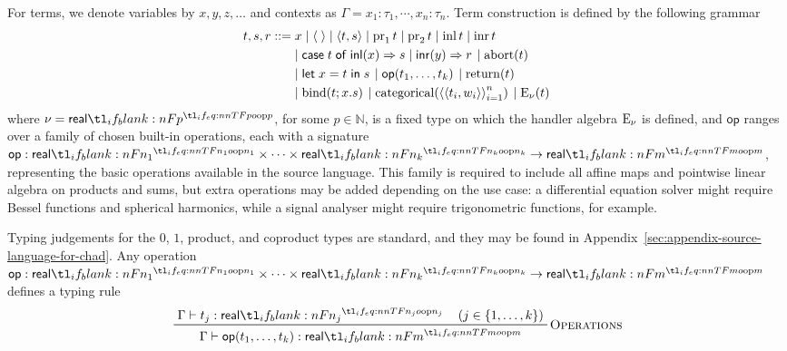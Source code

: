 \documentclass[11pt,a4paper]{article}
\theoremstyle{definition}
\theoremstyle{remark}
\providecommand{\N}{\mathbb{N}}
\providecommand{\srcop}{\mathsf{op}}
\providecommand{\casest}[5]{\mathsf{case}\;#1\;\mathsf{of}\;\mathsf{inl}(#2)\Rightarrow #3\;|\;\mathsf{inr}(#4)\Rightarrow #5}
\providecommand{\letst}[3]{\mathsf{let}\;#1=#2\;\mathsf{in}\;#3}
\begin{document}
For terms, we denote variables by \( x, y, z, \dots \) and contexts as \( \Gamma = x_{1} : \tau_{1}, \cdots, x_{n} : \tau_{n} \). Term construction is defined by the following grammar
\begin{equation}
  \label{eq:source-language-term-construction-grammar}
  \begin{aligned}
    t, s, r ::=
    &
      \left.
      x
      \mid
      \tuple{\;}
      \mid
      \tuple{t, s}
      \mid
      \opn[b]{pr}_{1} t
      \mid
      \opn[b]{pr}_{2} t
      \mid
      \opn[b]{inl} t
      \mid
      \opn[b]{inr} t
      \right.
    \\
    &
      \left.
      \mid
      \casest{t}{x}{s}{y}{r}
      \right.
    \left.
    \mid
    \fn[n]{ \opn[b]{abort} }{ t }
    \right.
    \\
    &
      \left.
      \mid
      \letst{x}{t}{s}
      \right.
    \left.
    \mid
    \fn[n]{ \srcop }{ t_{1}, \dots, t_{k} }
    \right.
      \left.
      \mid
      \fn[n]{ \opn[b]{return} }{ t }
      \right.
    \\
    &
      \left.
      \mid
      \fn[n]{ \opn[b]{bind} }{ t; x . s }
      \right.
      \left.
      \mid
      \fn[n]{ \opn[b]{categorical} }{
      \tuple{
      \tuple{
      t_{i}, w_{i}
      }
      }_{i = 1}^{n}
      }
      \right.
    \left.
    \mid
    \fn[n]{ \opn[b]{E}_{\nu} }{ t }
    \right.
  \end{aligned}
\end{equation}
where \( \nu = \srcreal[p] \), for some \( p \in \N \), is a fixed type on which the handler algebra \( \opn[b]{E}_{\nu} \) is defined, and \( \srcop \) ranges over a family of chosen built-in operations, each with a signature \( \srcop: \srcreal[n_{1}] \times \cdots \times \srcreal[n_{k}] \to \srcreal[m] \), representing the basic operations available in the source language. This family is required to include all affine maps and pointwise linear algebra on products and sums, but extra operations may be added depending on the use case: a differential equation solver might require Bessel functions and spherical harmonics, while a signal analyser might require trigonometric functions, for example.

Typing judgements for the \( 0 \), \( 1 \), product, and coproduct types are standard, and they may be found in Appendix~\ref{sec:appendix-source-language-for-chad}. Any operation \( \srcop: \srcreal[n_{1}] \times \cdots \times \srcreal[n_{k}] \to \srcreal[m] \) defines a typing rule
\begin{equation*}
\prftree[r]{\textsc{Operations}}{
\Gamma \vdash t_{j}: \srcreal[n_{j}]
\quad
\left( j \in \left\{ 1, \dots, k \right\} \right)
}{
\Gamma \vdash
\fn[n]{ \srcop }{ t_{1}, \dots, t_{k} } :
\srcreal[m]
}
\end{equation*}
\end{document}
